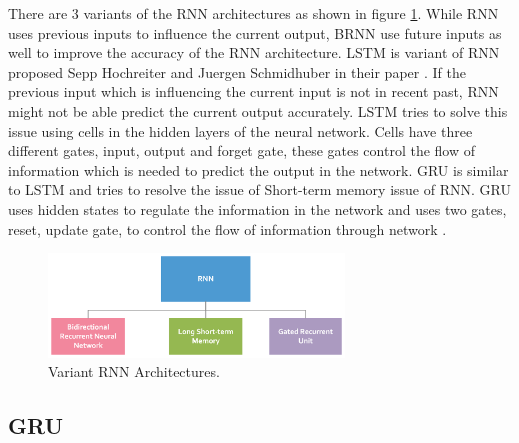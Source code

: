 \documentclass[twoside,11pt,a4paper]{article}
\begin{document}
\FloatBarrier
There are 3 variants of the \acs{RNN} architectures as shown in figure \ref{fig:various_rnn}. While \acs{RNN} uses previous inputs to influence the current output, \acs{BRNN} use future inputs as well to improve the accuracy of the \acs{RNN} architecture. \acf{LSTM} is variant of \acs{RNN} proposed Sepp Hochreiter and Juergen Schmidhuber in their paper \citep{hochreiter1997long}. If the previous input which is influencing the current input is not in recent past, \acs{RNN} might not be able predict the current output accurately. \acs{LSTM} tries to solve this issue using cells in the hidden layers of the neural network. Cells have three different gates, input, output and forget gate, these gates control the flow of information which is needed to predict the output in the network. \acf{GRU} is similar to \acs{LSTM} and tries to resolve the issue of Short-term memory issue of \acs{RNN}. \acs{GRU} uses hidden states to regulate the information in the network and uses two gates, reset, update gate, to control the flow of information through network \citep{cho2014learning}.\\
\begin{figure}[ht]
	\centering
	\includegraphics[width=0.7\textwidth]{various_rnn}
	\caption[Variant \acs{RNN} Architectures]{Variant \acs{RNN} Architectures.}
	\label{fig:various_rnn}
\end{figure}
\FloatBarrier
\subsection{\acf{GRU}}
\end{document}
